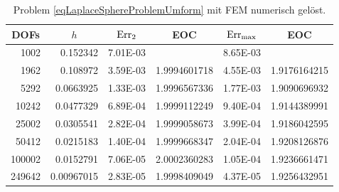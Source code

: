 \begin{beispiel}[Einheitssphäre]
       \begin{table}[htbp]
       \centering
       \begin{tabular}{|r|r|r|r|r|r|}
       \hline
       \multicolumn{1}{|c|}{DOFs} & \multicolumn{1}{c|}{\( h \)} & \multicolumn{1}{c|}{\( \text{Err}_{2} \)} & \multicolumn{1}{c|}{EOC} &
       \multicolumn{1}{c|}{ \( \text{Err}_{\max} \)} & \multicolumn{1}{c|}{EOC} \\ \hline
        1002 & 0.152342 & 7.01E-03 & \multicolumn{1}{l|}{} & 8.65E-03 & \multicolumn{1}{l|}{} \\ \hline
        1962 & 0.108972 & 3.59E-03 & 1.9994601718 & 4.55E-03 & 1.9176164215 \\ \hline
        5292 & 0.0663925 & 1.33E-03 & 1.9996567336 & 1.77E-03 & 1.9090696932 \\ \hline
        10242 & 0.0477329 & 6.89E-04 & 1.9999112249 & 9.40E-04 & 1.9144389991 \\ \hline
        25002 & 0.0305541 & 2.82E-04 & 1.9999058673 & 3.99E-04 & 1.9186042595 \\ \hline
        50412 & 0.0215183 & 1.40E-04 & 1.9999668347 & 2.04E-04 & 1.9208126876 \\ \hline
        100002 & 0.0152791 & 7.06E-05 & 2.0002360283 & 1.05E-04 & 1.9236661471 \\ \hline
        249642 & 0.00967015 & 2.83E-05 & 1.9998409049 & 4.37E-05 & 1.9256432951 \\ \hline
       \end{tabular}
       \caption[Laplace auf Sphäre (FEM)]{Problem \eqref{eqLaplaceSphereProblemUmform} mit FEM numerisch gelöst.}
       \label{tabLaplaceSphereFEM}
       \end{table}
    \end{beispiel}

